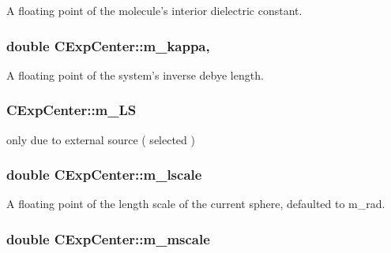 A floating point of the molecule's interior dielectric constant. 

\hypertarget{classCExpCenter_aca58b7a93949d83d4b7883b54d0473e5}{
\subsubsection[{m\-\_\-kappa}]{\setlength{\rightskip}{0pt plus 5cm}double C\-Exp\-Center\-::m\-\_\-kappa\hspace{0.3cm}{\ttfamily [static]}, {\ttfamily [protected]}}}\label{classCExpCenter_aca58b7a93949d83d4b7883b54d0473e5}


A floating point of the system's inverse debye length. 

\hypertarget{classCExpCenter_a89612776d4a057bdd4d36a7b4e10e647}{
\subsubsection[{m\-\_\-\-L\-S}]{ C\-Exp\-Center\-::m\-\_\-\-L\-S\hspace{0.3cm}{\ttfamily [protected]}}}\label{classCExpCenter_a89612776d4a057bdd4d36a7b4e10e647}


only due to external source ( selected ) 

\hypertarget{classCExpCenter_aac9d9de905652a9d78115a1b53091bce}{
\subsubsection[{m\-\_\-lscale}]{\setlength{\rightskip}{0pt plus 5cm}double C\-Exp\-Center\-::m\-\_\-lscale\hspace{0.3cm}{\ttfamily [protected]}}}\label{classCExpCenter_aac9d9de905652a9d78115a1b53091bce}


A floating point of the length scale of the current sphere, defaulted to m\-\_\-rad. 

\hypertarget{classCExpCenter_a7182695f02cc43411ebc67e64258a2ec}{
\subsubsection[{m\-\_\-mscale}]{\setlength{\rightskip}{0pt plus 5cm}double C\-Exp\-Center\-::m\-\_\-mscale\hspace{0.3cm}{\ttfamily [protected]}}}\label{classCExpCenter_a7182695f02cc43411ebc67e64258a2ec}


